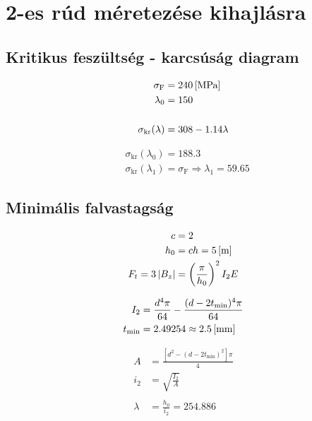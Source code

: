\section{2-es rúd méretezése kihajlásra}

\subsection{Kritikus feszültség - karcsúság diagram}
\begin{align*}
	\sigma_\text{F} &= \SI{240}{[\mega\pascal]} \\
	\lambda_0 &= 150 \\ \\
	\sigma_\text{kr}(\lambda) &= 308 - 1.14\lambda
\end{align*}

\begin{align*}
	&\sigma_\text{kr}(\lambda_0) = 188.3 \\
	&\sigma_\text{kr}(\lambda_1) = \sigma_\text{F} \Rightarrow \lambda_1 = 59.65
\end{align*}

\subsection{Minimális falvastagság}
\begin{align*}
	c &= 2 \\
	h_0 &= ch = \m{5} \\
	F_t = 3\left|B_z\right| &= \left(\frac{\pi}{h_0}\right)^2 I_2 E 
\end{align*}

\begin{align*}
	I_2 &= \frac{d^4 \pi}{64} - \frac{(d-2t_\text{min})^4 \pi}{64} \\
	t_\text{min} &= 2.49254 \approx \mm{2.5}
\end{align*}

\begin{align*}
	A &= \frac{\left[d^2 - (d-2t_\text{min})^2\right] \pi}{4} \\
	i_2 &= \sqrt{\frac{I_2}{A}} \\ \\
	\lambda &= \frac{h_0}{i_2} = 254.886
\end{align*}
